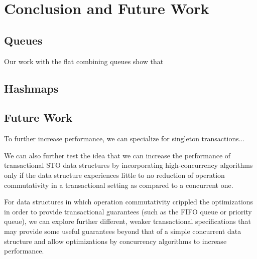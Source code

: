 \chapter{Conclusion and Future Work}

\section{Queues}
Our work with the flat combining queues show that 

\section{Hashmaps}

\section{Future Work}
To further increase performance, we can specialize for singleton transactions...

We can also further test the idea that we can increase the performance of transactional STO data structures by incorporating high-concurrency algorithms only if the data structure experiences little to no reduction of operation commutativity in a transactional setting as compared to a concurrent one.

For data structures in which operation commutativity crippled the optimizations in order to provide transactional guarantees (such as the FIFO queue or priority queue), we can explore further different, weaker transactional specifications that may provide some useful guarantees beyond that of a simple concurrent data structure and allow optimizations by concurrency algorithms to increase performance.

